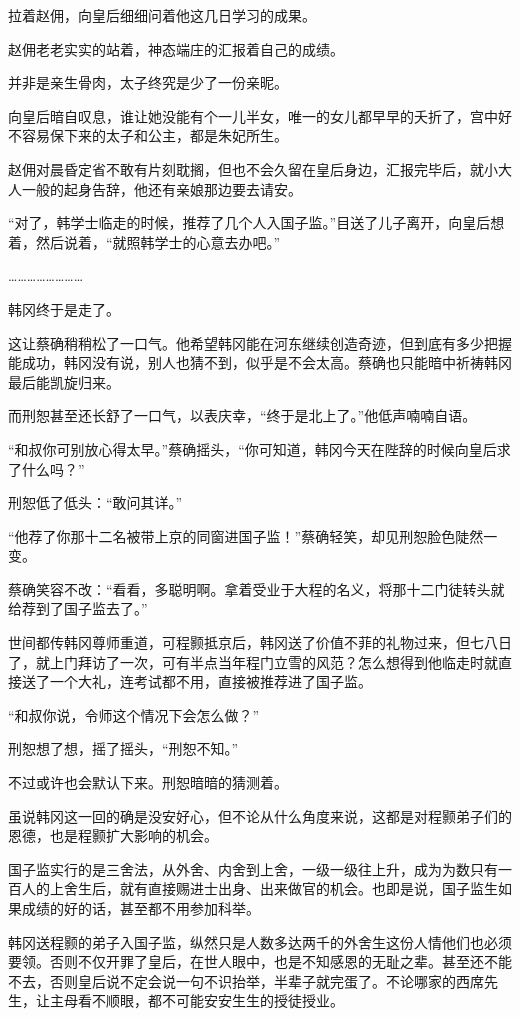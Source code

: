 拉着赵佣，向皇后细细问着他这几日学习的成果。

赵佣老老实实的站着，神态端庄的汇报着自己的成绩。

并非是亲生骨肉，太子终究是少了一份亲昵。

向皇后暗自叹息，谁让她没能有个一儿半女，唯一的女儿都早早的夭折了，宫中好不容易保下来的太子和公主，都是朱妃所生。

赵佣对晨昏定省不敢有片刻耽搁，但也不会久留在皇后身边，汇报完毕后，就小大人一般的起身告辞，他还有亲娘那边要去请安。

“对了，韩学士临走的时候，推荐了几个人入国子监。”目送了儿子离开，向皇后想着，然后说着，“就照韩学士的心意去办吧。”

……………………

韩冈终于是走了。

这让蔡确稍稍松了一口气。他希望韩冈能在河东继续创造奇迹，但到底有多少把握能成功，韩冈没有说，别人也猜不到，似乎是不会太高。蔡确也只能暗中祈祷韩冈最后能凯旋归来。

而刑恕甚至还长舒了一口气，以表庆幸，“终于是北上了。”他低声喃喃自语。

“和叔你可别放心得太早。”蔡确摇头，“你可知道，韩冈今天在陛辞的时候向皇后求了什么吗？”

刑恕低了低头：“敢问其详。”

“他荐了你那十二名被带上京的同窗进国子监！”蔡确轻笑，却见刑恕脸色陡然一变。

蔡确笑容不改：“看看，多聪明啊。拿着受业于大程的名义，将那十二门徒转头就给荐到了国子监去了。”

世间都传韩冈尊师重道，可程颢抵京后，韩冈送了价值不菲的礼物过来，但七八日了，就上门拜访了一次，可有半点当年程门立雪的风范？怎么想得到他临走时就直接送了一个大礼，连考试都不用，直接被推荐进了国子监。

“和叔你说，令师这个情况下会怎么做？”

刑恕想了想，摇了摇头，“刑恕不知。”

不过或许也会默认下来。刑恕暗暗的猜测着。

虽说韩冈这一回的确是没安好心，但不论从什么角度来说，这都是对程颢弟子们的恩德，也是程颢扩大影响的机会。

国子监实行的是三舍法，从外舍、内舍到上舍，一级一级往上升，成为为数只有一百人的上舍生后，就有直接赐进士出身、出来做官的机会。也即是说，国子监生如果成绩的好的话，甚至都不用参加科举。

韩冈送程颢的弟子入国子监，纵然只是人数多达两千的外舍生这份人情他们也必须要领。否则不仅开罪了皇后，在世人眼中，也是不知感恩的无耻之辈。甚至还不能不去，否则皇后说不定会说一句不识抬举，半辈子就完蛋了。不论哪家的西席先生，让主母看不顺眼，都不可能安安生生的授徒授业。

